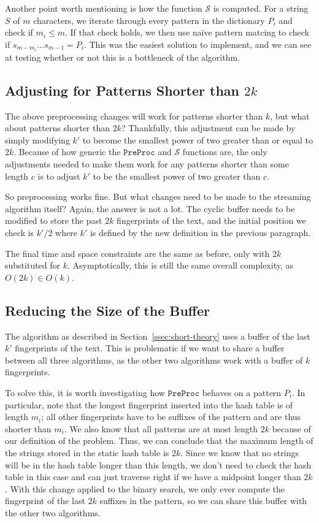 \documentclass[ %
                    author={Dominic Joseph Moylett},
                    degree={MEng},
                     title={Dictionary Matching with Fingerprints},
                  subtitle={An Empirical Analysis},
                      type={Research},
                      year={2014} ]{dissertation}
\begin{document}
Another point worth mentioning is how the function $\mathcal{S}$ is computed. For a string $S$ of $m$ characters, we iterate through every pattern in the dictionary $P_i$ and check if $m_i \leq m$. If that check holds, we then use na\"{i}ve pattern matcing to check if $s_{m - m_i}...s_{m - 1} = P_i$. This was the easiest solution to implement, and we can see at testing whether or not this is a bottleneck of the algorithm.

\subsection{Adjusting for Patterns Shorter than $2k$}

The above preprocessing changes will work for patterns shorter than $k$, but what about patterns shorter than $2k$? Thankfully, this adjustment can be made by simply modifying $k'$ to become the smallest power of two greater than or equal to $2k$. Because of how generic the $\texttt{PreProc}$ and $\mathcal{S}$ functions are, the only adjustments needed to make them work for any patterns shorter than some length $c$ is to adjust $k'$ to be the smallest power of two greater than $c$.

So preprocessing works fine. But what changes need to be made to the streaming algorithm itself? Again, the answer is not a lot. The cyclic buffer needs to be modified to store the past $2k$ fingerprints of the text, and the initial position we check is $k'/2$ where $k'$ is defined by the new definition in the previous paragraph.

The final time and space constraints are the same as before, only with $2k$ substituted for $k$. Asymptotically, this is still the same overall complexity, as $O(2k) \in O(k)$.

\subsection{Reducing the Size of the Buffer}

The algorithm as described in Section~\ref{ssec:short-theory} uses a buffer of the last $k'$ fingerprints of the text. This is problematic if we want to share a buffer between all three algorithms, as the other two algorithms work with a buffer of $k$ fingerprints.

To solve this, it is worth investigating how $\texttt{PreProc}$ behaves on a pattern $P_i$. In particular, note that the longest fingerprint inserted into the hash table is of length $m_i$; all other fingerprints have to be suffixes of the pattern and are thus shorter than $m_i$. We also know that all patterns are at most length $2k$ because of our definition of the problem. Thus, we can conclude that the maximum length of the strings stored in the static hash table is $2k$. Since we know that no strings will be in the hash table longer than this length, we don't need to check the hash table in this case and can just traverse right if we have a midpoint longer than $2k$. With this change applied to the binary search, we only ever compute the fingerprint of the last $2k$ suffixes in the pattern, so we can share this buffer with the other two algorithms.
\end{document}
